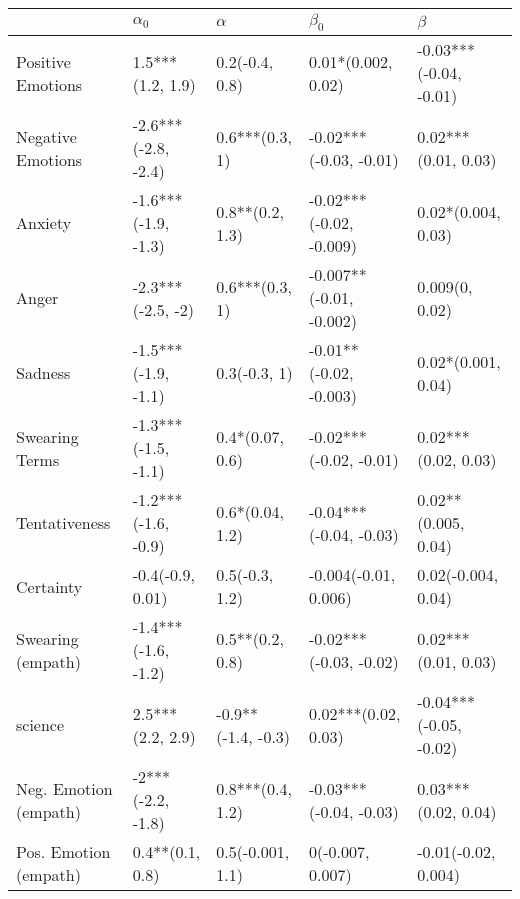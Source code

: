 \begin{tabular}{lllll}
\toprule
{} &           $\alpha_0$ &            $\alpha$ &                $\beta_0$ &                 $\beta$ \\
\midrule
Positive Emotions     &     1.5***(1.2, 1.9) &      0.2(-0.4, 0.8) &       0.01*(0.002, 0.02) &  -0.03***(-0.04, -0.01) \\
Negative Emotions     &  -2.6***(-2.8, -2.4) &      0.6***(0.3, 1) &   -0.02***(-0.03, -0.01) &     0.02***(0.01, 0.03) \\
Anxiety               &  -1.6***(-1.9, -1.3) &     0.8**(0.2, 1.3) &  -0.02***(-0.02, -0.009) &      0.02*(0.004, 0.03) \\
Anger                 &    -2.3***(-2.5, -2) &      0.6***(0.3, 1) &  -0.007**(-0.01, -0.002) &          0.009(0, 0.02) \\
Sadness               &  -1.5***(-1.9, -1.1) &        0.3(-0.3, 1) &   -0.01**(-0.02, -0.003) &      0.02*(0.001, 0.04) \\
Swearing Terms        &  -1.3***(-1.5, -1.1) &     0.4*(0.07, 0.6) &   -0.02***(-0.02, -0.01) &     0.02***(0.02, 0.03) \\
Tentativeness         &  -1.2***(-1.6, -0.9) &     0.6*(0.04, 1.2) &   -0.04***(-0.04, -0.03) &     0.02**(0.005, 0.04) \\
Certainty             &     -0.4(-0.9, 0.01) &      0.5(-0.3, 1.2) &     -0.004(-0.01, 0.006) &      0.02(-0.004, 0.04) \\
Swearing (empath)     &  -1.4***(-1.6, -1.2) &     0.5**(0.2, 0.8) &   -0.02***(-0.03, -0.02) &     0.02***(0.01, 0.03) \\
science               &     2.5***(2.2, 2.9) &  -0.9**(-1.4, -0.3) &      0.02***(0.02, 0.03) &  -0.04***(-0.05, -0.02) \\
Neg. Emotion (empath) &    -2***(-2.2, -1.8) &    0.8***(0.4, 1.2) &   -0.03***(-0.04, -0.03) &     0.03***(0.02, 0.04) \\
Pos. Emotion (empath) &      0.4**(0.1, 0.8) &    0.5(-0.001, 1.1) &         0(-0.007, 0.007) &     -0.01(-0.02, 0.004) \\
\bottomrule
\end{tabular}
